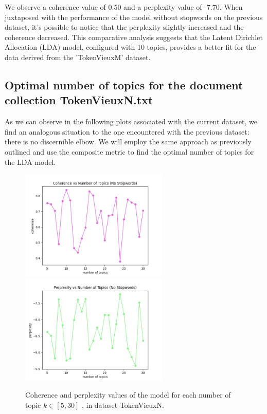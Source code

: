 \documentclass[10pt]{article} %
\begin{document}
	We observe a coherence value of 0.50 and a perplexity value of -7.70. When juxtaposed with the performance of the model without stopwords on the previous dataset, it's possible to notice that the perplexity slightly increased and the coherence decreased. This comparative analysis suggests that the Latent Dirichlet Allocation (LDA) model, configured with 10 topics, provides a better fit for the data derived from the 'TokenVieuxM' dataset.
	
	\subsection{Optimal number of topics for the document collection TokenVieuxN.txt}
	
	As we can observe in the following plots associated with the current dataset, we find an analogous situation to the one encountered with the previous dataset: there is no discernible elbow. We will employ the same approach as previously outlined and use the composite metric to find the optimal number of topics for the LDA model.
	
		\begin{figure}[H]
		\centering
		\includegraphics[width=7cm]{images/coherence_no_stopwords_diff_n_topics_2}
		\includegraphics[width=7cm]{images/perplexity_no_stopwords_diff_n_topics_2}
	\caption{Coherence and perplexity values of the model for each number of topic $k \in [5, 30]$ , in dataset TokenVieuxN.}
\end{figure}
	
\end{document}
